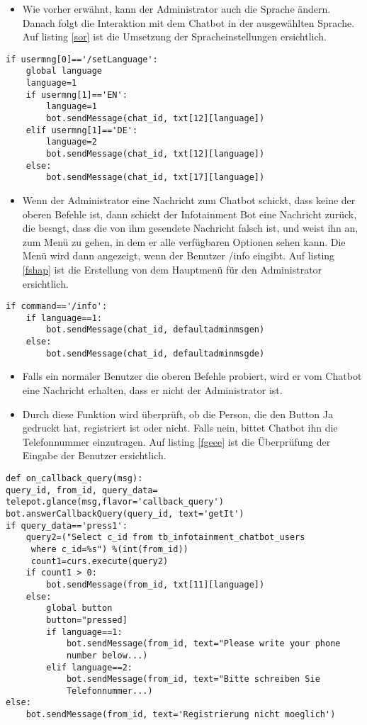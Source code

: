 \label{notfallnach}
\begin{itemize}
	\item Wie vorher erw\"ahnt, kann der Administrator auch die Sprache \"andern. Danach folgt die Interaktion mit dem Chatbot in der ausgew\"ahlten Sprache. Auf listing \ref{sor} ist die Umsetzung der Spracheinstellungen ersichtlich.
\end{itemize}
\begin{lstlisting}[frame=single]
if usermng[0]=='/setLanguage':
	global language
	language=1
	if usermng[1]=='EN':
		language=1
		bot.sendMessage(chat_id, txt[12][language])
	elif usermng[1]=='DE':
		language=2
		bot.sendMessage(chat_id, txt[12][language])
	else:
		bot.sendMessage(chat_id, txt[17][language])
\end{lstlisting}
\label{sor}
\begin{itemize}
	\item Wenn der Administrator eine Nachricht zum Chatbot schickt, dass keine der oberen Befehle ist, dann schickt der Infotainment Bot eine Nachricht zur\"uck, die besagt, dass die von ihm gesendete Nachricht falsch ist, und weist ihn an, zum Menü zu gehen, in dem er alle verfügbaren Optionen sehen kann. Die Men\"u wird dann angezeigt, wenn der Benutzer /info eingibt. Auf listing \ref{fshap} ist die Erstellung von dem Hauptmen\"u f\"ur den Administrator ersichtlich.
\end{itemize}
\begin{lstlisting}[frame=single]
if command=='/info':
	if language==1:
		bot.sendMessage(chat_id, defaultadminmsgen)
	else:
		bot.sendMessage(chat_id, defaultadminmsgde)
\end{lstlisting}
\label{fshap}
\begin{itemize}
	\item Falls ein normaler Benutzer die oberen Befehle probiert, wird er vom Chatbot eine Nachricht erhalten, dass er nicht der Administrator ist.
\end{itemize}
\begin{itemize}
	\item Durch diese Funktion wird überprüft, ob die Person, die den Button Ja gedruckt hat, registriert ist oder nicht. Falls nein, bittet Chatbot ihn die Telefonnummer einzutragen. Auf listing \ref{fgeee} ist die Überprüfung der Eingabe der Benutzer ersichtlich.  
\end{itemize}
\begin{lstlisting}[frame=single]
def on_callback_query(msg):
query_id, from_id, query_data=
telepot.glance(msg,flavor='callback_query')
bot.answerCallbackQuery(query_id, text='getIt')
if query_data=='press1':
	query2=("Select c_id from tb_infotainment_chatbot_users
	 where c_id=%s") %(int(from_id))
	 count1=curs.execute(query2)
	if count1 > 0:
		bot.sendMessage(from_id, txt[11][language])
	else:
		global button
		button="pressed]
		if language==1:
			bot.sendMessage(from_id, text="Please write your phone 
			number below...)
		elif language==2:
			bot.sendMessage(from_id, text="Bitte schreiben Sie 
			Telefonnummer...)
else:
	bot.sendMessage(from_id, text='Registrierung nicht moeglich')
\end{lstlisting}
